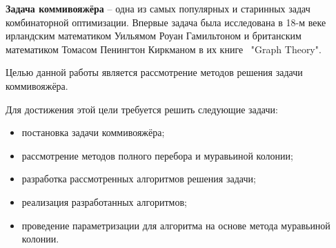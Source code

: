 
\textbf{Задача коммивояжёра} – одна из самых популярных и старинных задач комбинаторной оптимизации. Впервые задача была исследована в 18-м веке ирландским математиком Уильямом Роуан Гамильтоном и британским математиком Томасом Пенингтон Киркманом в их книге~\cite{tsp-donald} "Graph Theory".

Целью данной работы является рассмотрение методов решения задачи коммивояжёра.

Для достижения этой цели требуется решить следующие задачи:

\begin{itemize}
	\item постановка задачи коммивояжёра;
	\item рассмотрение методов полного перебора и муравьиной колонии;
	\item разработка рассмотренных алгоритмов решения задачи;
	\item реализация разработанных алгоритмов;
	\item проведение параметризации для алгоритма на основе метода муравьиной колонии. 
\end{itemize}

\newpage

\clearpage
